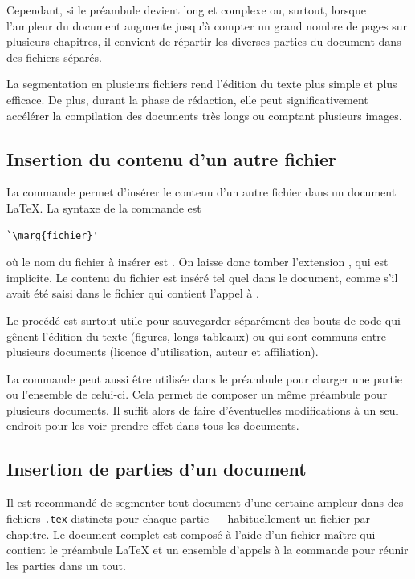 Cependant, si le préambule devient long et complexe ou, surtout,
lorsque l'ampleur du document augmente jusqu'à compter un grand nombre
de pages sur plusieurs chapitres, il convient de répartir les diverses
parties du document dans des fichiers séparés.

La segmentation en plusieurs fichiers rend l'édition du texte plus
simple et plus efficace. De plus, durant la phase de rédaction, elle
peut significativement accélérer la compilation des documents très
longs ou comptant plusieurs images.

\subsection{Insertion du contenu d'un autre fichier}
\label{sec:organisation:include:input}

La commande \cmd{} permet d'insérer le contenu d'un autre
fichier dans un document {\LaTeX}. La syntaxe de la commande est
\begin{lstlisting}
`\marg{fichier}'
\end{lstlisting}
où le nom du fichier à insérer est . On
laisse donc tomber l'extension , qui est implicite. Le
contenu du fichier est inséré tel quel dans le document, comme s'il
avait été saisi dans le fichier qui contient l'appel à \cmd{}.

Le procédé est surtout utile pour sauvegarder séparément des bouts de
code qui gênent l'édition du texte (figures, longs
tableaux) ou qui sont communs entre plusieurs documents (licence
d'utilisation, auteur et affiliation).

La commande peut aussi être utilisée dans le préambule pour charger
une partie ou l'ensemble de celui-ci. Cela permet de composer un même
préambule pour plusieurs documents. Il suffit alors de faire
d'éventuelles modifications à un seul endroit pour les voir prendre
effet dans tous les documents.

\subsection{Insertion de parties d'un document}
\label{sec:organisation:include:include}

Il est recommandé de segmenter tout document d'une certaine ampleur
dans des fichiers \verb=.tex= distincts pour chaque partie ---
habituellement un fichier par chapitre. Le document complet est
composé à l'aide d'un fichier maître qui contient le préambule
{\LaTeX} et un ensemble d'appels à la commande \cmdprint{}
pour réunir les parties dans un tout.

